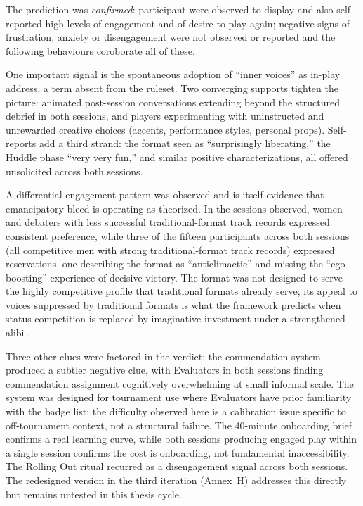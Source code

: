 The prediction was \textit{confirmed}: participant were observed to display and also self-reported high-levels of engagement and of desire to play again; negative signs of frustration, anxiety or disengagement were not observed or reported and the following behaviours coroborate all of these.

One important signal is the spontaneous adoption of ``inner voices'' as in-play address, a term absent from the ruleset. Two converging supports tighten the picture: animated post-session conversations extending beyond the structured debrief in both sessions, and players experimenting with uninstructed and unrewarded creative choices (accents, performance styles, personal props). Self-reports add a third strand: the format seen as ``surprisingly liberating,'' the Huddle phase ``very very fun,'' and similar positive characterizations, all offered unsolicited across both sessions.

A differential engagement pattern was observed and is itself evidence that emancipatory bleed \parencite{kemper2017battle, kemper2020wyrding} is operating as theorized. In the sessions observed, women and debaters with less successful traditional-format track records expressed consistent preference, while three of the fifteen participants across both sessions (all competitive men with strong traditional-format track records) expressed reservations, one describing the format as ``anticlimactic'' and missing the ``ego-boosting'' experience of decisive victory. The format was not designed to serve the highly competitive profile that traditional formats already serve; its appeal to voices suppressed by traditional formats is what the framework predicts when status-competition is replaced by imaginative investment under a strengthened alibi \parencite{bowman2021magic, deterding2017alibis}.

Three other clues were factored in the verdict: the commendation system produced a subtler negative clue, with Evaluators in both sessions finding commendation assignment cognitively overwhelming at small informal scale. The system was designed for tournament use where Evaluators have prior familiarity with the badge list; the difficulty observed here is a calibration issue specific to off-tournament context, not a structural failure. The 40-minute onboarding brief confirms a real learning curve, while both sessions producing engaged play within a single session confirms the cost is onboarding, not fundamental inaccessibility. The Rolling Out ritual recurred as a disengagement signal across both sessions. The redesigned version in the third iteration (Annex~H) addresses this directly but remains untested in this thesis cycle.

